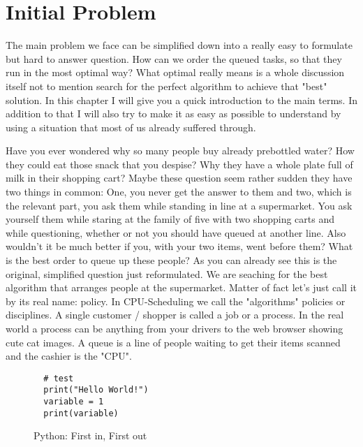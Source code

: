 \chapter{Initial Problem}

The main problem we face can be simplified down into a really easy to formulate but hard to answer question.
How can we order the queued tasks, so that they run in the most optimal way?
What optimal really means is a whole discussion itself not to mention search for the perfect algorithm to achieve that "best" solution.
In this chapter I will give you a quick introduction to the main terms.
In addition to that I will also try to make it as easy as possible to understand by using a situation that most of us already suffered through.

Have you ever wondered why so many people buy already prebottled water? 
How they could eat those snack that you despise?
Why they have a whole plate full of milk in their shopping cart?
Maybe these question seem rather sudden they have two things in common:
One, you never get the answer to them and two, which is the relevant part, you ask them while standing in line at a supermarket.
You ask yourself them while staring at the family of five with two shopping carts and while questioning, whether or not you should have queued at another line.
Also wouldn't it be much better if you, with your two items, went before them?
What is the best order to queue up these people?
As you can already see this is the original, simplified question just reformulated.
We are seaching for the best algorithm that arranges people at the supermarket.
Matter of fact let's just call it by its real name: policy.
In CPU-Scheduling we call the "algorithms" policies or disciplines.
A single customer / shopper is called a job or a process.
In the real world a process can be anything from your drivers to the web browser showing cute cat images.
A queue is a line of people waiting to get their items scanned and the cashier is the "CPU".

\begin{figure}[h]
\begin{verbatim}
  # test
  print("Hello World!")
  variable = 1
  print(variable)
\end{verbatim}
\caption{Python: First in, First out}
\label{code:fifo}
\end{figure}


